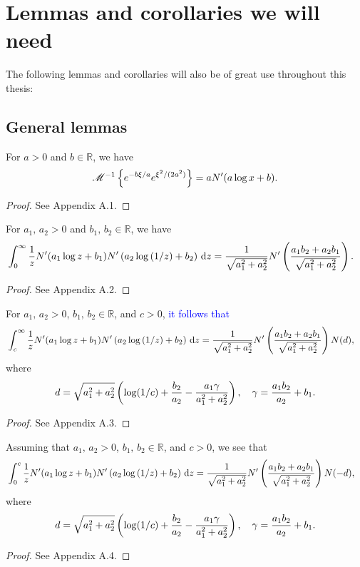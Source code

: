 \section{Lemmas and corollaries we will need}
The following lemmas and corollaries will also be of great use throughout this thesis:
\subsection{General lemmas}
	\begin{lemma}
		\label{lem:2}
	For $a > 0$ and $b \in \mathbb{R}$, we have
	\begin{equation*}
		\mathscr M^{-1}\left\{ e^{-b\xi/a}e^{\xi^2/(2a^2)} \right\} = aN'(a\log x + b).
	\end{equation*}
	\end{lemma}
\begin{proof}
	See Appendix A.1.
\end{proof}
	\begin{lemma}
		\label{lem:1}
		For $a_1, \, a_2 > 0$ and $b_1, \, b_2 \in \mathbb{R}$, we have
			\begin{align*}
				&\int_0^\infty \frac{1}{z}N'(a_1\log z + b_1)N'\left(a_2\log\left( 1/z \right) + b_2 \right) \, \mathrm d z =  \frac{1}{\sqrt{a_1^2 + a_2^2}}N'\left( \frac{a_1b_2 + a_2b_1}{\sqrt{a_1^2+a_2^2}} \right).
			\end{align*}
	\end{lemma}
	\begin{proof}
		See Appendix A.2.
	\end{proof}
	\begin{lemma}
		\label{lem:2b}
		For $a_1, \, a_2 > 0$, $b_1, \, b_2 \in \mathbb{R}$, and $c > 0$, \textcolor{blue}{it follows that}
		\begin{align*}
			&\int_c^\infty \frac{1}{z}N'(a_1\log z + b_1)N'\left(a_2\log\left( 1/z \right) + b_2 \right) \, \mathrm d z =  \frac{1}{\sqrt{a_1^2 + a_2^2}}N'\left( \frac{a_1b_2 + a_2b_1}{\sqrt{a_1^2+a_2^2}} \right)N(d),
		\end{align*}
		where
		$$
			d = \sqrt{a_1^2+a_2^2}\left( \log(1/c) + \frac{b_2}{a_2} - \frac{a_1\gamma}{a_1^2+a_2^2} \right), \quad
			\gamma = \frac{a_1b_2}{a_2} + b_1.
		$$
	\end{lemma}
	\begin{proof}
		See Appendix A.3.
	\end{proof}
	
	\begin{lemma}
		\label{lem:2bb}
		Assuming that $a_1, \, a_2 > 0$, $b_1, \, b_2 \in \mathbb{R}$, and $c > 0$, we see that
		\begin{align*}
			&\int_0^c \frac{1}{z}N'(a_1\log z + b_1)N'\left(a_2\log\left( 1/z \right) + b_2 \right) \, \mathrm d z =  \frac{1}{\sqrt{a_1^2 + a_2^2}}N'\left( \frac{a_1b_2 + a_2b_1}{\sqrt{a_1^2+a_2^2}} \right)N(-d),
		\end{align*}
		where
		$$
			d = \sqrt{a_1^2+a_2^2}\left( \log(1/c) + \frac{b_2}{a_2} - \frac{a_1\gamma}{a_1^2+a_2^2} \right), \quad
			\gamma = \frac{a_1b_2}{a_2} + b_1.
		$$
	\end{lemma}
	\begin{proof}
		See Appendix A.4.
	\end{proof}

